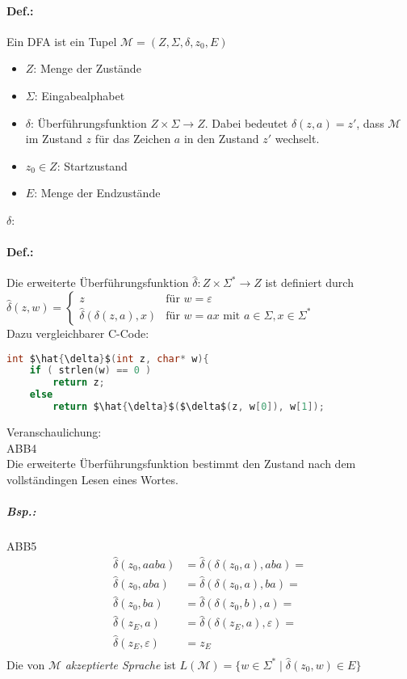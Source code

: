 \paragraph{Def.:} Ein DFA ist ein Tupel $\mathcal{M}=(Z, \Sigma, \delta, z_0, E)$
\begin{itemize}
\item $Z$: Menge der Zustände
\item $\Sigma$: Eingabealphabet
\item $\delta$: Überführungsfunktion $Z\times \Sigma \rightarrow Z$. Dabei bedeutet $\delta (z,a) = z'$, dass $\mathcal{M}$ im Zustand $z$ für das Zeichen $a$ in den Zustand $z'$ wechselt.
\item $z_0\in Z$: Startzustand
\item $E$: Menge der Endzustände
\end{itemize}
$\delta$: \\

\paragraph{Def.:} Die erweiterte Überführungsfunktion $\hat{\delta}:Z\times \Sigma^*\rightarrow Z$ ist definiert durch\\
$\hat{\delta}(z,w)=\begin{cases}
z & \text{für }w = \varepsilon\\
\hat{\delta}(\delta(z,a),x) & \text{für }w=ax \text{ mit } a\in \Sigma ,x \in \Sigma^*
\end{cases}$\\
Dazu vergleichbarer C-Code:
\begin{lstlisting}[language=C]
int $\hat{\delta}$(int z, char* w){
	if ( strlen(w) == 0 )
		return z;
	else
		return $\hat{\delta}$($\delta$(z, w[0]), w[1]);
\end{lstlisting}
Veranschaulichung:\\
ABB4\\
Die erweiterte Überführungsfunktion bestimmt den Zustand nach dem vollständingen Lesen eines Wortes.

\subparagraph{Bsp.:} \parskp
ABB5
\begin{align*}
\hat{\delta}(z_0, aaba) &= \hat{\delta}(\delta(z_0,a),aba)=\\
\hat{\delta}(z_0, aba) &= \hat{\delta}(\delta(z_0,a),ba)=\\
\hat{\delta}(z_0, ba) &= \hat{\delta}(\delta(z_0,b),a)=\\
\hat{\delta}(z_E, a) &= \hat{\delta}(\delta(z_E,a), \varepsilon)=\\
\hat{\delta}(z_E, \varepsilon) &= z_E\\
\end{align*}
Die von $\mathcal{M}$ \emph{akzeptierte Sprache} ist $L(\mathcal{M})=\{w\in \Sigma^* \;|\; \hat{\delta}(z_0, w) \in E\}$

